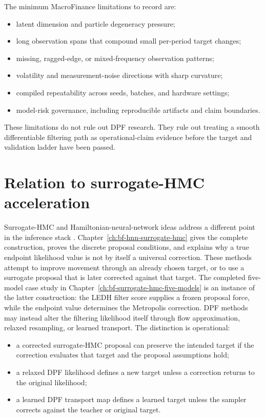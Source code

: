 The minimum MacroFinance limitations to record are:
\begin{itemize}
  \item latent dimension and particle degeneracy pressure;
  \item long observation spans that compound small per-period target changes;
  \item missing, ragged-edge, or mixed-frequency observation patterns;
  \item volatility and measurement-noise directions with sharp curvature;
  \item compiled repeatability across seeds, batches, and hardware settings;
  \item model-risk governance, including reproducible artifacts and claim
    boundaries.
\end{itemize}
These limitations do not rule out DPF research.  They rule out treating a
smooth differentiable filtering path as operational-claim evidence before the
target and validation ladder have been passed.

\section{Relation to surrogate-HMC acceleration}
\label{sec:bf-dpf-hmc-hnn-surrogates}

Surrogate-HMC and Hamiltonian-neural-network ideas address a different point in
the inference stack
\citep{greydanus2019hamiltonian,dhulipala2022latent,hoffman2019neutra,parno2018transport}.
Chapter~\ref{ch:bf-hnn-surrogate-hmc} gives the complete construction, proves
the discrete proposal conditions, and explains why a true endpoint likelihood
value is not by itself a universal correction.  These methods attempt to
improve movement through an already chosen target, or to use a surrogate
proposal that is later corrected against that target.  The completed
five-model case study in Chapter~\ref{ch:bf-surrogate-hmc-five-models} is an
instance of the latter construction: the LEDH filter score supplies a frozen
proposal force, while the endpoint value determines the Metropolis correction.  DPF methods may instead
alter the filtering likelihood itself through flow approximation, relaxed
resampling, or learned transport.  The distinction is operational:
\begin{itemize}
  \item a corrected surrogate-HMC proposal can preserve the intended target if
    the correction evaluates that target and the proposal assumptions hold;
  \item a relaxed DPF likelihood defines a new target unless a correction
    returns to the original likelihood;
  \item a learned DPF transport map defines a learned target unless the sampler
    corrects against the teacher or original target.
\end{itemize}


